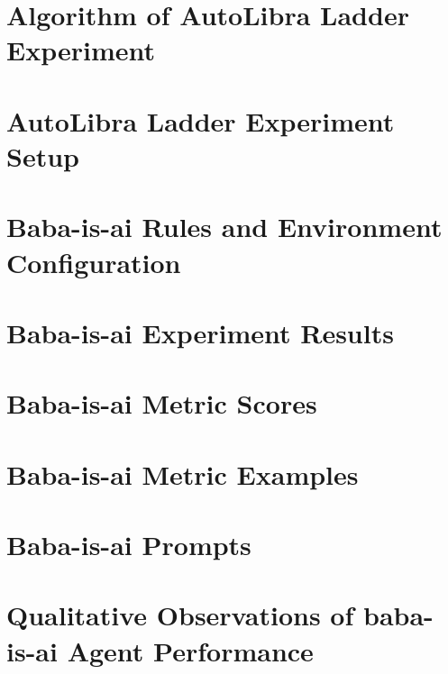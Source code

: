 \documentclass[../main.tex]{subfiles}
\begin{document}
\section{Algorithm of AutoLibra Ladder Experiment}
\label{appendix:algo1}


\section{AutoLibra Ladder Experiment Setup}
\label{appendix:autolibra_setup}


\section{Baba-is-ai Rules and Environment Configuration}
\label{appendix:baba_is_ai_rules}


\section{Baba-is-ai Experiment Results}
\label{appendix:heldout}


\section{Baba-is-ai Metric Scores}
\label{appendix:babaisai}

\newpage

\section{Baba-is-ai Metric Examples}
\label{appendix:babaisai_metrics}

\newpage

\section{Baba-is-ai Prompts}
\label{appendix:babaisai_prompts}

\newpage

\section{Qualitative Observations of baba-is-ai Agent Performance}
\label{appendix:baba_is_ai_obs}

\newpage
\end{document}
